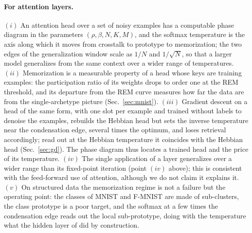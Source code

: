 \documentclass[11pt,a4paper]{article}
\begin{document}
\paragraph{For attention layers.} $(i)$ An attention head over a set of noisy examples has a computable phase diagram in the parameters $(\rho,\beta,N,K,M)$, and the softmax temperature is the axis along which it moves from crosstalk to prototype to memorization; the two edges of the generalization window scale as $1/N$ and $1/\sqrt N$, so that a larger model generalizes from the same context over a wider range of temperatures. $(ii)$ Memorization is a measurable property of a head whose keys are training examples: the participation ratio of its weights drops to order one at the REM threshold, and its departure from the REM curve measures how far the data are from the single-archetype picture (Sec.\ \ref{sec:mnist}). $(iii)$ Gradient descent on a head of the same form, with one slot per example and trained without labels to denoise the examples, rebuilds the Hebbian head but sets the inverse temperature near the condensation edge, several times the optimum, and loses retrieval accordingly; read out at the Hebbian temperature it coincides with the Hebbian head (Sec.\ \ref{sec:gd}). The phase diagram thus locates a trained head and the price of its temperature. $(iv)$ The single application of a layer generalizes over a wider range than its fixed-point iteration (point $(iv)$ above); this is consistent with the feed-forward use of attention, although we do not claim it explains it. $(v)$ On structured data the memorization regime is not a failure but the operating point: the classes of MNIST and F-MNIST are made of sub-clusters, the class prototype is a poor target, and the softmax at a few times the condensation edge reads out the local sub-prototype, doing with the temperature what the hidden layer of \cite{Alemanno2023} did by construction.
\end{document}
